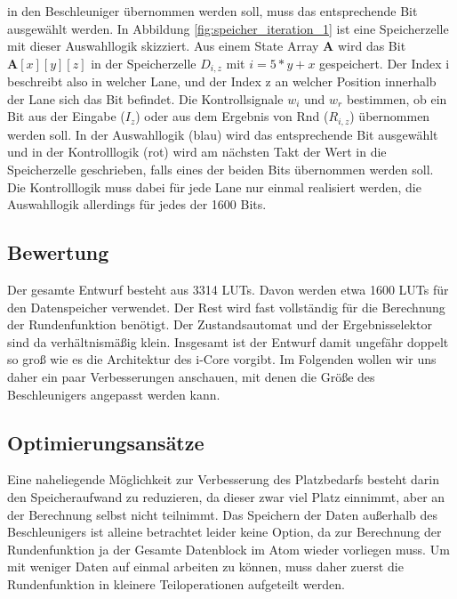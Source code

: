 in den Beschleuniger übernommen werden soll, muss das entsprechende Bit ausgewählt werden. In Abbildung \ref{fig:speicher_iteration_1} ist eine Speicherzelle
mit dieser Auswahllogik skizziert. Aus einem State Array $\textbf{A}$ wird das Bit $\textbf{A}[x][y][z]$ in der Speicherzelle $D_{i,z}$ mit $i = 5 * y + x$ gespeichert.
Der Index i beschreibt also in welcher Lane, und der Index z an welcher Position innerhalb der Lane sich das Bit befindet. Die Kontrollsignale $w_i$ und $w_r$ bestimmen,
ob ein Bit aus der Eingabe ($I_z$) oder aus dem Ergebnis von Rnd ($R_{i,z}$) übernommen werden soll. In der Auswahllogik (blau) wird das entsprechende Bit ausgewählt und in der
Kontrolllogik (rot) wird am nächsten Takt der Wert in die Speicherzelle geschrieben, falls eines der beiden Bits übernommen werden soll.
Die Kontrolllogik muss dabei für jede Lane nur einmal realisiert werden, die Auswahllogik allerdings für jedes der 1600 Bits. 

\subsection{Bewertung}
Der gesamte Entwurf besteht aus 3314 LUTs. Davon werden etwa 1600 LUTs für den Datenspeicher verwendet.
Der Rest wird fast vollständig für die Berechnung der Rundenfunktion benötigt. Der Zustandsautomat und der Ergebnisselektor sind da verhältnismäßig klein.
Insgesamt ist der Entwurf damit ungefähr doppelt so groß wie es die Architektur des i-Core vorgibt. Im Folgenden wollen wir uns daher ein paar Verbesserungen anschauen,
mit denen die Größe des Beschleunigers angepasst werden kann.

\subsection{Optimierungsansätze}
\label{cha:iteration_1_optimierungen}
Eine naheliegende Möglichkeit zur Verbesserung des Platzbedarfs besteht darin den Speicheraufwand zu reduzieren, da dieser zwar viel Platz einnimmt,
aber an der Berechnung selbst nicht teilnimmt. Das Speichern der Daten außerhalb des Beschleunigers ist alleine betrachtet leider keine Option, da zur Berechnung der Rundenfunktion
ja der Gesamte Datenblock im Atom wieder vorliegen muss. Um mit weniger Daten auf einmal arbeiten zu können, muss daher zuerst die Rundenfunktion in kleinere
Teiloperationen aufgeteilt werden.

